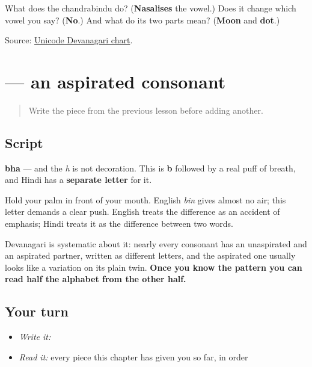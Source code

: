 \begin{tcolorbox}[breakable,colback=teal!4,colframe=teal!35!black,title={Before you move on}]
What does the chandrabindu do? (\textbf{Nasalises} the vowel.) Does it change which vowel you say? (\textbf{No}.) And what do its two parts mean? (\textbf{Moon} and \textbf{dot}.)

Source: \href{https://www.unicode.org/charts/PDF/U0900.pdf}{Unicode Devanagari chart}.
\end{tcolorbox}
\section[\texorpdfstring{\hi{भ} (bha)}{भ (bha)}]{ — an aspirated consonant}

\label{lesson:HI-W12-bha}



\begin{quote}
Write the piece from the previous lesson before adding another.
\end{quote}

\subsection*{Script}

\begin{quote}
\end{quote}

\textbf{bha} — and the \emph{h} is not decoration. This is \textbf{b} followed by a real puff of breath, and Hindi has a \textbf{separate letter} for it.

Hold your palm in front of your mouth. English \emph{bin} gives almost no air; this letter demands a clear push. English treats the difference as an accident of emphasis; Hindi treats it as the difference between two words.

Devanagari is systematic about it: nearly every consonant has an unaspirated and an aspirated partner, written as different letters, and the aspirated one usually looks like a variation on its plain twin. \textbf{Once you know the pattern you can read half the alphabet from the other half.}

\subsection*{Your turn}
\begin{itemize}
\raggedright
  \item \emph{Write it:} 
  \item \emph{Read it:} every piece this chapter has given you so far, in order
\end{itemize}

